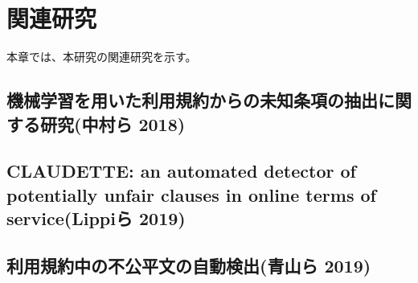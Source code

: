\chapter{関連研究}
\label{related}

本章では、本研究の関連研究を示す。

\section{機械学習を用いた利用規約からの未知条項の抽出に関する研究(中村ら 2018)}

\section{CLAUDETTE: an automated detector of potentially unfair clauses in online terms of service(Lippiら 2019)}

\section{利用規約中の不公平文の自動検出(青山ら 2019)}


